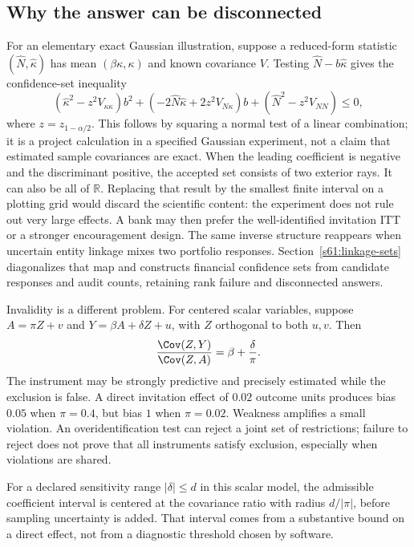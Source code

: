 \subsection{Why the answer can be disconnected}
For an elementary exact Gaussian illustration, suppose a reduced-form
statistic $(\widehat N,\widehat\kappa)$ has mean
$(\beta\kappa,\kappa)$ and known covariance $V$. Testing
$\widehat N-b\widehat\kappa$ gives the confidence-set inequality
\begin{equation}
 (\widehat\kappa^2-z^2V_{\kappa\kappa})b^2
 +(-2\widehat N\widehat\kappa+2z^2V_{N\kappa})b
 +(\widehat N^2-z^2V_{NN})\le0,
 \label{r3:ratio-set}
\end{equation}
where $z=z_{1-\alpha/2}$. This follows by squaring a normal test of a
linear combination; it is a project calculation in a specified Gaussian
experiment, not a claim that estimated sample covariances are exact.
When the leading coefficient is negative and the discriminant positive,
the accepted set consists of two exterior rays. It can also be all of
$\mathbb R$. Replacing that result by the smallest finite interval on
a plotting grid would discard the scientific content: the experiment
does not rule out very large effects. A bank may then prefer the
well-identified invitation ITT or a stronger encouragement design.
The same inverse structure reappears when uncertain entity linkage mixes two
portfolio responses. Section~\ref{s61:linkage-sets} diagonalizes that map and
constructs financial confidence sets from candidate responses and audit
counts, retaining rank failure and disconnected answers.

Invalidity is a different problem. For centered scalar variables,
suppose $A=\pi Z+v$ and $Y=\beta A+\delta Z+u$, with $Z$ orthogonal
to both $u,v$. Then
\begin{equation}
 \frac{\Cov(Z,Y)}{\Cov(Z,A)}=\beta+\frac{\delta}{\pi}.
 \label{r3:invalid-iv}
\end{equation}
The instrument may be strongly predictive and precisely estimated while
the exclusion is false. A direct invitation effect of $0.02$ outcome units
produces bias $0.05$ when $\pi=0.4$, but bias $1$ when $\pi=0.02$.
Weakness amplifies a small violation. An overidentification test can reject
a joint set of restrictions; failure to reject does not prove that all
instruments satisfy exclusion, especially when violations are shared.

For a declared sensitivity range $|\delta|\le d$ in this scalar model,
the admissible coefficient interval is centered at the covariance ratio
with radius $d/|\pi|$, before sampling uncertainty is added. That interval
comes from a substantive bound on a direct effect, not from a diagnostic
threshold chosen by software.

